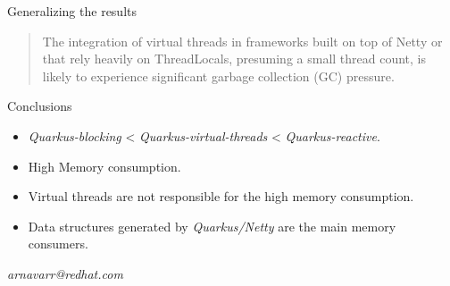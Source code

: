 \documentclass{beamer}
\begin{document}
\begin{frame}{Generalizing the results}
    \begin{quote}
        The integration of virtual threads in frameworks built on top of Netty or that rely heavily on ThreadLocals, presuming a small thread count, is likely to experience significant garbage collection (GC) pressure.
    \end{quote}
\end{frame}
\begin{frame}{Conclusions}
    \begin{itemize}
        \item \emph{Quarkus-blocking} < \emph{Quarkus-virtual-threads}  < \emph{Quarkus-reactive}.
        \item High Memory consumption.
        \item Virtual threads are not responsible for the high memory consumption.
        \item Data structures generated by \emph{Quarkus/Netty} are the main memory consumers.
    \end{itemize}
    \vspace{1cm}\hspace{7cm}\emph{arnavarr@redhat.com}
\end{frame}
\end{document}
